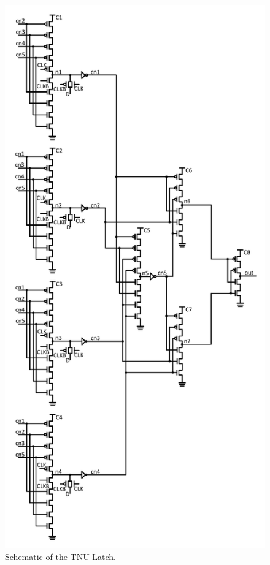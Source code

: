 \begin{figure}[!tbp]
	\centering
	\includegraphics[width=\linewidth]{Figures/TNULatch}
	\caption{Schematic of the TNU-Latch.}
	\label{fig:TNU}
\end{figure}

